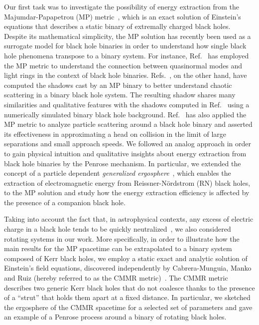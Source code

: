 Our first task was to investigate the possibility of energy extraction from the Majumdar-Papapetrou (MP) metric~\cite{MAJUMDAR1947,PAPAPETROU1947}, which is an exact solution of Einstein's equations that describes a static binary of extremally charged black holes. Despite its mathematical simplicity, the MP solution has recently been used as a surrogate model for black hole binaries in order to understand how single black hole phenomena transpose to a binary system. For instance, Ref.~\cite{ASSUMPCAO2018} has employed the MP metric to understand the connection between quasinormal modes and light rings in the context of black hole binaries. Refs.~\cite{Shipley:2016omi,Shipley:2019kfq}, on the other hand, have computed the shadows cast by an MP binary to better understand chaotic scattering in a binary black hole system. The resulting shadow shares many similarities and qualitative features with the shadows computed in Ref.~\cite{Bohn:2014xxa} using a numerically simulated binary black hole background. Ref.~\cite{BINI2019} has also applied the MP metric to analyze particle scattering around a black hole binary and asserted its effectiveness in approximating a head on collision in the limit of large separations and small approach speeds. We followed an analog approach in order to gain physical intuition and qualitative insights about energy extraction from black hole binaries by the Penrose mechanism. In particular, we extended the concept of a particle dependent \emph{generalized ergosphere}~\cite{RUFFINI1971}, which enables the extraction of electromagnetic energy from Reissner-N\"ordstrom (RN) black holes, to the MP solution and study how the energy extraction efficiency is affected by the presence of a companion black hole.

Taking into account the fact that, in astrophysical contexts, any excess of electric charge in a black hole tends to be quickly neutralized~\cite{gibbons1975}, we also considered rotating systems in our work. More specifically, in order to illustrate how the main results for the MP spacetime can be extrapolated to a binary system composed of Kerr black holes, we employ a static exact and analytic solution of Einstein's field equations, discovered independently by Cabrera-Munguia, Manko and Ruiz (hereby referred to as the CMMR metric)~\cite{cabrera_metric,manko_ruiz_metric, manko_ruiz_thermo}. The CMMR metric describes two generic Kerr black holes that do not coalesce thanks to the presence of a ``strut'' that holds them apart at a fixed distance. In particular, we sketched the ergosphere of the CMMR spacetime for a selected set of parameters and gave an example of a Penrose process around a binary of rotating black holes.

